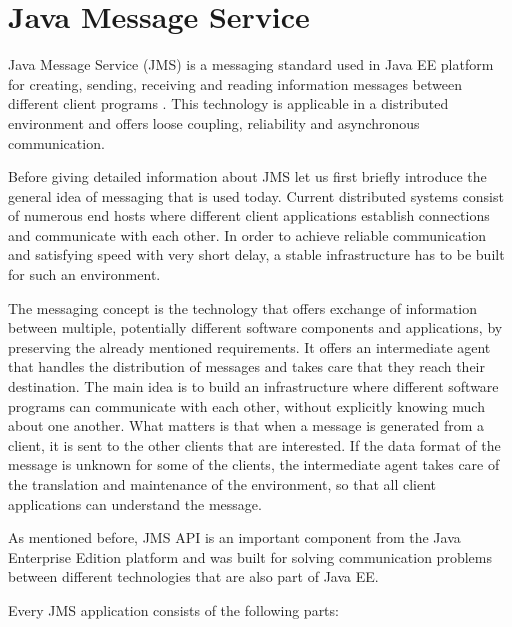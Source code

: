 \documentclass{sigplanconf}
\begin{document}
\section*{Java Message Service}

\smallskip

Java Message Service (JMS) is a messaging standard used in Java EE platform for creating, sending, receiving and reading information messages between different client programs \cite{jms} \cite{jmsd}. This technology is applicable in a distributed environment and offers loose coupling, reliability and asynchronous communication.

Before giving detailed information about JMS let us first briefly introduce the general idea of messaging that is used today. Current distributed systems consist of numerous end hosts where different client applications establish connections and communicate with each other. In order to achieve reliable communication and satisfying speed with very short delay, a stable infrastructure has to be built for such an environment.

The messaging concept is the technology that offers exchange of information between multiple, potentially different software components and applications, by preserving the already mentioned requirements. It offers an intermediate agent that handles the distribution of messages and takes care that they reach their destination. The main idea is to build an infrastructure where different software programs can communicate with each other, without explicitly knowing much about one another. What matters is that when a message is generated from a client, it is sent to the other clients that are interested. If the data format of the message is unknown for some of the clients, the intermediate agent takes care of the translation and maintenance of the environment, so that all client applications can understand the message.

As mentioned before, JMS API is an important component from the Java Enterprise Edition platform and was built for solving communication problems between different technologies that are also part of Java EE.
	
Every JMS application consists of the following parts:
\end{document}

